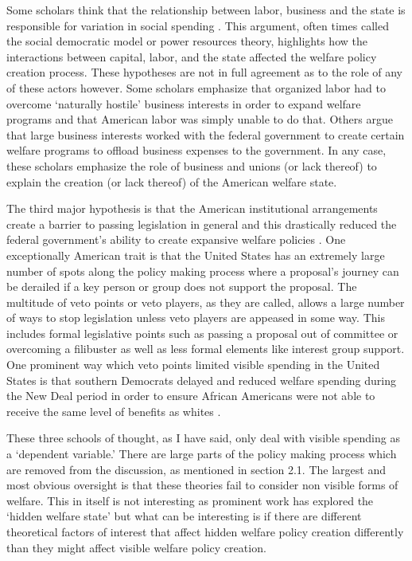 \documentclass[12pt]{article}
\begin{document}
Some scholars think that the relationship between labor, business and the state is responsible for variation in social spending \citep{korpi1980, swenson2004}. This argument, often times called the social democratic model or power resources theory, highlights how the interactions between capital, labor, and the state affected the welfare policy creation process. These hypotheses are not in full agreement as to the role of any of these actors however. Some scholars emphasize that organized labor had to overcome `naturally hostile' business interests in order to expand welfare programs and that American labor was simply unable to do that. Others argue that large business interests worked with the federal government to create certain welfare programs to offload business expenses to the government. In any case, these scholars emphasize the role of business and unions (or lack thereof) to explain the creation (or lack thereof) of the American welfare state. 

The third major hypothesis is that the American institutional arrangements create a barrier to passing legislation in general and this drastically reduced the federal government's ability to create expansive welfare policies \citep{pierson1995, robertson2011}. One exceptionally American trait is that the United States has an extremely large number of spots along the policy making process where a proposal's journey can be derailed if a key person or group does not support the proposal. The multitude of veto points or veto players, as they are called, allows a large number of ways to stop legislation unless veto players are appeased in some way. This includes formal legislative points such as passing a proposal out of committee or overcoming a filibuster as well as less formal elements like interest group support. One prominent way which veto points limited visible spending in the United States is that southern Democrats delayed and reduced welfare spending during the New Deal period in order to ensure African Americans were not able to receive the same level of benefits as whites \citep{katznelson2013}. 

These three schools of thought, as I have said, only deal with visible spending as a `dependent variable.' There are large parts of the policy making process which are removed from the discussion, as mentioned in section 2.1. The largest and most obvious oversight is that these theories fail to consider non visible forms of welfare. This in itself is not interesting as prominent work has explored the `hidden welfare state' but what can be interesting is if there are different theoretical factors of interest that affect hidden welfare policy creation differently than they might affect visible welfare policy creation.
\end{document}
